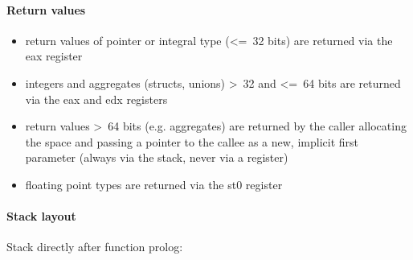\clearpage

\paragraph{Return values}

\begin{itemize}
\item return values of pointer or integral type (\textless=\ 32 bits) are returned via the eax register
\item integers and aggregates (structs, unions) \textgreater\ 32 and \textless=\ 64 bits are returned via the eax and edx registers
\item return values \textgreater\ 64 bits (e.g. aggregates) are returned by the caller allocating the space and
passing a pointer to the callee as a new, implicit first parameter (always via the stack, never via a register)
\item floating point types are returned via the st0 register
\end{itemize}


\paragraph{Stack layout}

Stack directly after function prolog:\\


